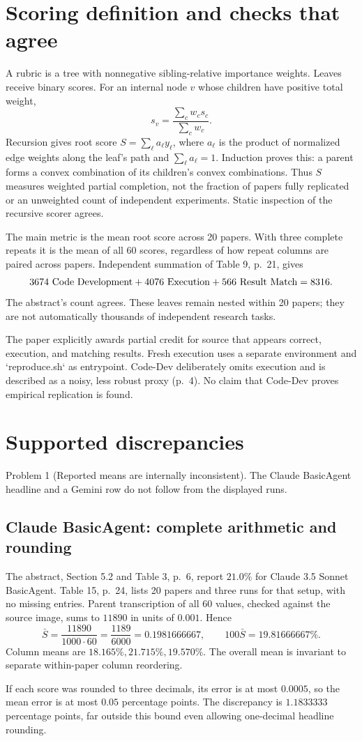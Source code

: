 \documentclass[10pt]{article}
\begin{document}
\section*{Scoring definition and checks that agree}
A rubric is a tree with nonnegative sibling-relative importance weights. Leaves receive binary scores. For an internal node \(v\) whose children have positive total weight, \[s_v=\frac{\sum_c w_c s_c}{\sum_c w_c}.\] Recursion gives root score \(S=\sum_\ell a_\ell y_\ell\), where \(a_\ell\) is the product of normalized edge weights along the leaf’s path and \(\sum_\ell a_\ell=1\). Induction proves this: a parent forms a convex combination of its children’s convex combinations. Thus \(S\) measures weighted partial completion, not the fraction of papers fully replicated or an unweighted count of independent experiments. Static inspection of the recursive scorer agrees.\par
The main metric is the mean root score across 20 papers. With three complete repeats it is the mean of all 60 scores, regardless of how repeat columns are paired across papers. Independent summation of Table 9, p. 21, gives \[3674\ {\rm Code\ Development}
 +4076\ {\rm Execution}
 +566\ {\rm Result\ Match}=8316.\] The abstract’s count agrees. These leaves remain nested within 20 papers; they are not automatically thousands of independent research tasks.\par
The paper explicitly awards partial credit for source that appears correct, execution, and matching results. Fresh execution uses a separate environment and `reproduce.sh` as entrypoint. Code-Dev deliberately omits execution and is described as a noisy, less robust proxy (p. 4). No claim that Code-Dev proves empirical replication is found.\par
\section*{Supported discrepancies}
Problem 1 (Reported means are internally inconsistent).  The Claude BasicAgent headline and a Gemini row do not follow from the displayed runs.\par
\subsection*{Claude BasicAgent: complete arithmetic and rounding}
The abstract, Section 5.2 and Table 3, p. 6, report \(21.0\%\) for Claude 3.5 Sonnet BasicAgent. Table 15, p. 24, lists 20 papers and three runs for that setup, with no missing entries. Parent transcription of all 60 values, checked against the source image, sums to \(11890\) in units of \(0.001\). Hence \[\bar S=\frac{11890}{1000\cdot60}
       =\frac{1189}{6000}
       =0.1981666667,\qquad
 100\bar S=19.81666667\%.\] Column means are \(18.165\%,21.715\%,19.570\%\). The overall mean is invariant to separate within-paper column reordering.\par
If each score was rounded to three decimals, its error is at most \(0.0005\), so the mean error is at most \(0.05\) percentage points. The discrepancy is \(1.1833333\) percentage points, far outside this bound even allowing one-decimal headline rounding.\par
\end{document}
